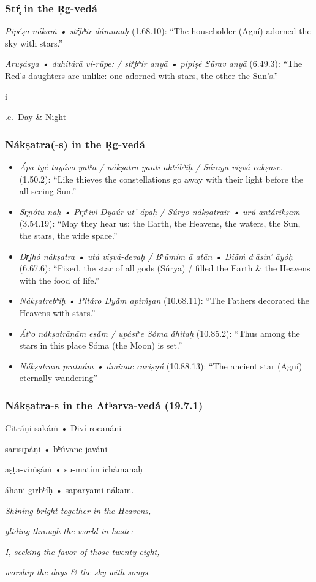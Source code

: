 \documentclass[pdf]{beamer}
\newcommand{\Subitem}[1]{{\setlength\itemindent{12pt} \item[-] #1}}
\begin{document}
\begin{frame} \frametitle{Stŕ̥ in the R̥g-vedá}
\begin{itemize}
	\item {\textit{Pipéşa nā́kaṁ • stŕ̥bʰir dámūnāḥ} (1.68.10): ``The householder (Agní) adorned the sky with stars.''}
	\item {\textit{Aruṣásya • duhitárā ví-rūpe: / stŕ̥bʰir anyā́ • pipişé Sū́rav anyā́} (6.49.3): ``The Red's daughters are unlike: one adorned with stars, the other the Sun's.''}
	\Subitem i.e.~Day \& Night
\end{itemize}
\end{frame}

\begin{frame} \frametitle{Nákṣatra(-s) in the R̥g-vedá}
\begin{itemize}
	\item {\textit{Ápa tyé tāyávo yatʰā / nákṣatrā yanti aktúbʰiḥ / Sū́rāya vişvá-cakṣase.} (1.50.2): ``Like thieves the constellations go away with their light before the all-seeing Sun.''}
	\item {\textit{Ṡr̥ṇótu naḥ • Pr̥tʰivī́ Dyāúr ut' ā́paḥ / Sū́ryo nákṣatrāir • urú antárikṣam} (3.54.19): ``May they hear us: the Earth, the Heavens, the waters, the Sun, the stars, the wide space.''}
	\item {\textit{Dr̥ḷhó nákṣatra • utá vişvá-devaḥ / Bʰū́mim ā́ atān • Diā́ṁ dʰāsín' āyóḥ} (6.67.6): ``Fixed, the star of all gods (Sū́rya) / filled the Earth \& the Heavens with the food of life.''}
	\item {\textit{Nákṣatrebʰiḥ • Pitáro Dyā́m apiṁşan} (10.68.11): ``The Fathers decorated the Heavens with stars.''}
	\item {\textit{Átʰo nákṣatrāṇām eṣā́m / upástʰe Sóma ā́hitaḥ} (10.85.2): ``Thus among the stars in this place Sóma (the Moon) is set.''}
	\item {\textit{Nákṣatram pratnám • áminac cariṣṇú} (10.88.13): ``The ancient star (Agní) eternally wandering''}
\end{itemize}
\end{frame}

\begin{frame} \frametitle{Nákṣatra-s in the Atʰarva-vedá (19.7.1)}
\begin{center}
\begin{multicols}{2}
\small{
	Citrā́ṇi sākáṁ • Diví rocanā́ni

	sarīsr̥pā́ṇi • bʰúvane javā́ni

	aṣṭā-viṁşáṁ • su-matím ichámānaḥ

	áhāni gīrbʰíḥ • saparyāmi nā́kam.

	\vspace{12pt}

	\textit{Shining bright together in the Heavens,}

	\textit{gliding through the world in haste:}

	\textit{I, seeking the favor of those twenty-eight,}

	\textit{worship the days \& the sky with songs.}
}
\end{multicols}
\end{center}
\end{frame}
\end{document}
